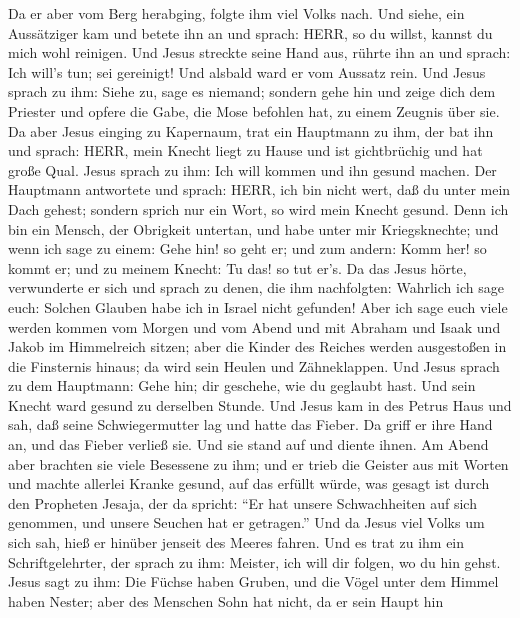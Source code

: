  Da er aber vom Berg herabging, folgte ihm viel Volks nach.
 Und siehe, ein Aussätziger kam und betete ihn an und
sprach: HERR, so du willst, kannst du mich wohl reinigen. 
Und Jesus streckte seine Hand aus, rührte ihn an und sprach: Ich will's
tun; sei gereinigt! Und alsbald ward er vom Aussatz rein. 
Und Jesus sprach zu ihm: Siehe zu, sage es niemand; sondern gehe hin und
zeige dich dem Priester und opfere die Gabe, die Mose befohlen hat, zu
einem Zeugnis über sie.  Da aber Jesus einging zu Kapernaum,
trat ein Hauptmann zu ihm, der bat ihn  und sprach: HERR,
mein Knecht liegt zu Hause und ist gichtbrüchig und hat große Qual.
 Jesus sprach zu ihm: Ich will kommen und ihn gesund machen.
 Der Hauptmann antwortete und sprach: HERR, ich bin nicht
wert, daß du unter mein Dach gehest; sondern sprich nur ein Wort, so
wird mein Knecht gesund.  Denn ich bin ein Mensch, der
Obrigkeit untertan, und habe unter mir Kriegsknechte; und wenn ich sage
zu einem: Gehe hin! so geht er; und zum andern: Komm her! so kommt er;
und zu meinem Knecht: Tu das! so tut er's.  Da das Jesus
hörte, verwunderte er sich und sprach zu denen, die ihm nachfolgten:
Wahrlich ich sage euch: Solchen Glauben habe ich in Israel nicht
gefunden!  Aber ich sage euch viele werden kommen vom
Morgen und vom Abend und mit Abraham und Isaak und Jakob im Himmelreich
sitzen;  aber die Kinder des Reiches werden ausgestoßen in
die Finsternis hinaus; da wird sein Heulen und Zähneklappen.
 Und Jesus sprach zu dem Hauptmann: Gehe hin; dir geschehe,
wie du geglaubt hast. Und sein Knecht ward gesund zu derselben Stunde.
 Und Jesus kam in des Petrus Haus und sah, daß seine
Schwiegermutter lag und hatte das Fieber.  Da griff er ihre
Hand an, und das Fieber verließ sie. Und sie stand auf und diente ihnen.
 Am Abend aber brachten sie viele Besessene zu ihm; und er
trieb die Geister aus mit Worten und machte allerlei Kranke gesund,
 auf das erfüllt würde, was gesagt ist durch den Propheten
Jesaja, der da spricht: ``Er hat unsere Schwachheiten auf sich genommen,
und unsere Seuchen hat er getragen.''  Und da Jesus viel
Volks um sich sah, hieß er hinüber jenseit des Meeres fahren.
 Und es trat zu ihm ein Schriftgelehrter, der sprach zu
ihm: Meister, ich will dir folgen, wo du hin gehst.  Jesus
sagt zu ihm: Die Füchse haben Gruben, und die Vögel unter dem Himmel
haben Nester; aber des Menschen Sohn hat nicht, da er sein Haupt hin
